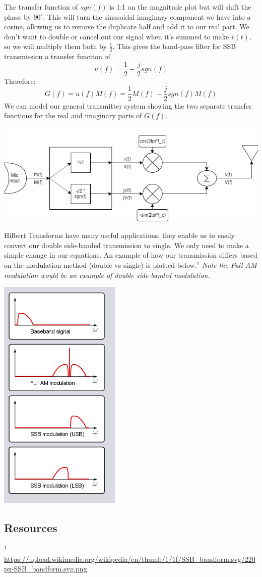 \documentclass[12pt]{article}
\begin{document}
The transfer function of $sgn(f)$ is 1:1 on the magnitude plot but will shift the phase by $90^\circ$. This will turn the sinusoidal imaginary component we have into a cosine, allowing us to remove the duplicate half and add it to our real part. We don't want to double or cancel out our signal when it's summed to make $v(t)$, so we will multiply them both by $\frac{1}{2}$. This gives the band-pass filter for SSB transmission a transfer funciton of 
$$u(f) = \frac{1}{2} - \frac{j}{2} sgn(f)$$
Therefore:
$$G(f) = u(f)M(f) = \frac{1}{2}M(f) - \frac{j}{2} sgn(f)M(f)$$
We can model our general transmitter system showing the two separate transfer functions for the real and imaginary parts of $G(f)$.
\begin{center}
\includegraphics[scale=0.75]{BPF_SSB}
\end{center}

Hilbert Transforms have many useful applications, they enable us to easily convert our double side-banded transmission to single. We only need to make a simple change in our equations. An example of how our transmission differs based on the modulation method (double vs single) is plotted below.$^1$ \textit{Note the Full AM modulation would be an example of double side-banded modulation.}\\
\begin{center}
\includegraphics[scale=1]{SSB.png}
\end{center}

\subsection*{Resources}
$^1$\url{https://upload.wikimedia.org/wikipedia/en/thumb/1/1f/SSB_bandform.svg/220px-SSB_bandform.svg.png}
\end{document}
